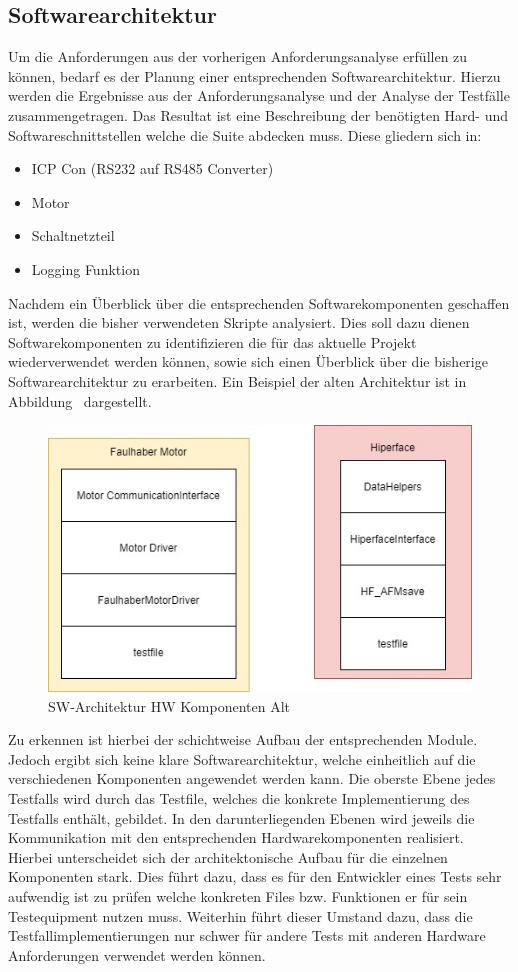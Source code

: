 \subsection{Softwarearchitektur}
Um die Anforderungen aus der vorherigen Anforderungsanalyse erfüllen zu können, bedarf es der Planung einer entsprechenden Softwarearchitektur. Hierzu werden die Ergebnisse aus der Anforderungsanalyse und der Analyse der Testfälle zusammengetragen. Das Resultat ist eine Beschreibung der benötigten Hard- und Softwareschnittstellen welche die Suite abdecken muss.  Diese gliedern sich in:
\begin{itemize}
	\item ICP Con (RS232 auf RS485 Converter)
	\item Motor 
	\item Schaltnetzteil
	\item Logging Funktion
\end{itemize}
Nachdem ein Überblick über die entsprechenden Softwarekomponenten geschaffen ist, werden die bisher verwendeten Skripte analysiert. Dies soll dazu dienen Softwarekomponenten zu identifizieren die für das aktuelle Projekt wiederverwendet werden können, sowie sich einen Überblick über die bisherige Softwarearchitektur zu erarbeiten.
Ein Beispiel der alten Architektur ist in Abbildung \dq {}\dq~dargestellt.
\begin{figure}[h]
  \centering
   \includegraphics[width=1\textwidth]{img/Uebersicht_alt.jpg} 
   \caption{SW-Architektur HW Komponenten Alt}
   \label{fig:Uebersicht_alt.jpg}
\end{figure}
\cleardoublepage
Zu erkennen ist hierbei der schichtweise Aufbau der entsprechenden Module. Jedoch ergibt sich keine klare Softwarearchitektur, welche einheitlich auf die verschiedenen Komponenten angewendet werden kann. Die oberste Ebene jedes Testfalls wird durch das Testfile, welches die konkrete Implementierung des Testfalls enthält, gebildet. In den darunterliegenden Ebenen wird jeweils die Kommunikation mit den entsprechenden Hardwarekomponenten realisiert. Hierbei unterscheidet sich der architektonische Aufbau für die einzelnen Komponenten stark. Dies führt dazu, dass es für den Entwickler eines Tests sehr aufwendig ist zu prüfen welche konkreten Files bzw. Funktionen er für sein Testequipment nutzen muss. Weiterhin führt dieser Umstand dazu, dass die Testfallimplementierungen nur schwer für andere Tests mit anderen Hardware Anforderungen verwendet werden können.
